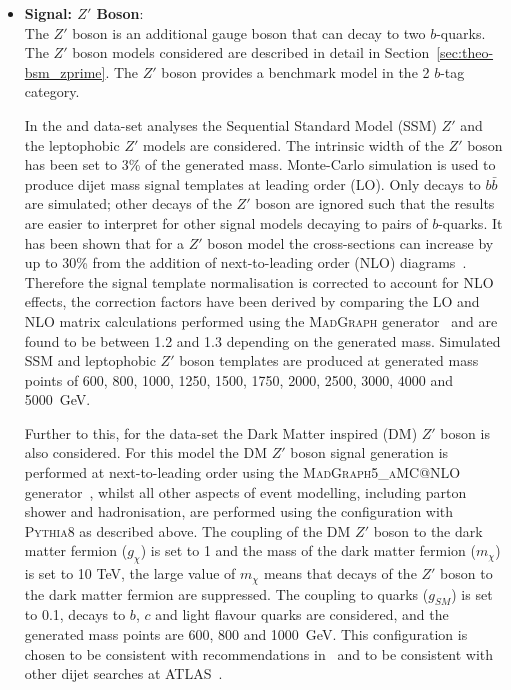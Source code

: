 \begin{itemize}[leftmargin=*]
\item\textbf{Signal: $Z'$ Boson}:  \\
  The $Z'$ boson is an additional gauge boson that can decay to two $b$-quarks.
  The $Z'$ boson models considered are
  described in detail in Section~\ref{sec:theo-bsm_zprime}.
  The $Z'$ boson provides a benchmark model in the 2 $b$-tag category. \vspace{1em}

  In the \summer{} and \lm{} data-set analyses
  the Sequential Standard Model (SSM) $Z'$ and the leptophobic $Z'$ models are considered.
  The intrinsic width of the $Z'$ boson has been set to 3\% of the generated mass.
  Monte-Carlo simulation is used to produce dijet mass signal templates at leading order (LO).
  Only decays to $b\bar{b}$ are simulated;
  other decays of the  $Z'$ boson are ignored such that the
  results are easier to interpret for other signal models decaying to pairs of $b$-quarks.
  It has been shown that for a $Z'$ boson model the cross-sections can increase by up to 30\%
  from the addition of next-to-leading order (NLO) diagrams~\cite{evt-NLO_zprime}.
  Therefore the signal template normalisation is corrected to account for NLO effects,
  the correction factors have been derived by comparing
  the LO and NLO matrix calculations performed using the \textsc{MadGraph} generator~\cite{dibjet-madGraph}
  and are found to be between 1.2 and 1.3 depending on the generated mass.
  Simulated SSM and leptophobic $Z'$ boson templates are produced at generated mass points of
  600, 800, 1000, 1250, 1500, 1750, 2000, 2500, 3000, 4000 and 5000~GeV.  \vspace{1em}
  
  Further to this, for the \lm{} data-set
  the Dark Matter inspired (DM) $Z'$ boson is also considered.
  For this model the DM $Z'$ boson signal generation is performed at next-to-leading order using the \textsc{MadGraph5\_aMC@NLO} generator~\cite{dibjet-madGraph_NLO},
  whilst all other aspects of event modelling, including parton shower and hadronisation, are performed using the configuration with \textsc{Pythia8} as described above.
  The coupling of the DM $Z'$ boson to the dark matter fermion ($g_{\chi}$) is set to 1 and
  the mass of the dark matter fermion ($m_{\chi}$) is set to 10 TeV,
  the large value of $m_\chi$ means that decays of the $Z'$ boson to the dark matter fermion are suppressed.
  The coupling to quarks ($g_{SM}$) is set to 0.1,
  decays to $b$, $c$ and light flavour quarks are considered,
  and the generated mass points are 600, 800 and 1000~GeV.
  This configuration is chosen to be consistent with recommendations in~\cite{theo_bsm-zprime_dm}
  and to be consistent with other dijet searches at ATLAS~\cite{dijet-mori16_paper}.  \vspace{1em}


\end{itemize}
